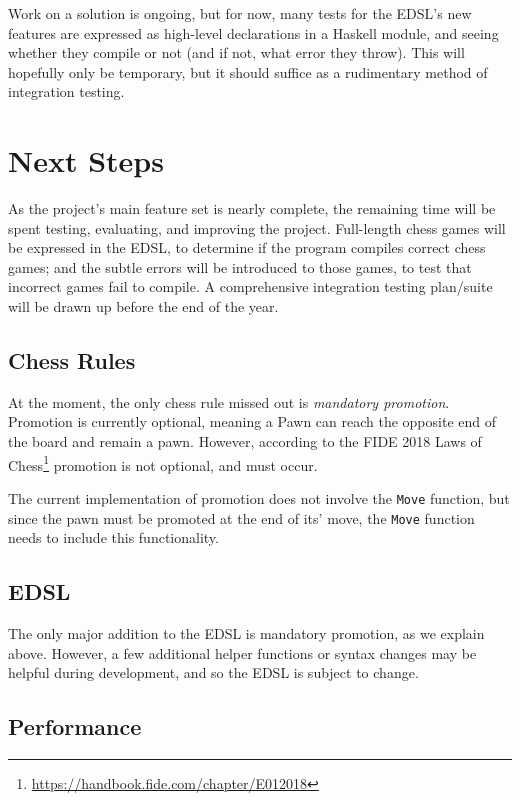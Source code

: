 \documentclass[12pt, a4paper]{scrartcl}
\begin{document}
Work on a solution is ongoing, but for now, many tests for the EDSL's new features are expressed as high-level declarations in a Haskell module, and seeing whether they compile or not (and if not, what error they throw). This will hopefully only be temporary, but it should suffice as a rudimentary method of integration testing.

\section{Next Steps}

As the project's main feature set is nearly complete, the remaining time will be spent testing, evaluating, and improving the project. Full-length chess games will be expressed in the EDSL, to determine if the program compiles correct chess games; and the subtle errors will be introduced to those games, to test that incorrect games fail to compile. A comprehensive integration testing plan/suite will be drawn up before the end of the year.

\subsection{Chess Rules}

At the moment, the only chess rule missed out is \emph{mandatory promotion}. Promotion is currently optional, meaning a Pawn can reach the opposite end of the board and remain a pawn. However, according to the FIDE 2018 Laws of Chess\footnote{\url{https://handbook.fide.com/chapter/E012018}} promotion is not optional, and must occur.

The current implementation of promotion does not involve the \lstinline{Move} function, but since the pawn must be promoted at the end of its' move, the \lstinline{Move} function needs to include this functionality.

\subsection{EDSL}

The only major addition to the EDSL is mandatory promotion, as we explain above. However, a few additional helper functions or syntax changes may be helpful during development, and so the EDSL is subject to change.

\subsection{Performance}
\end{document}
